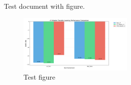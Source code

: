 \documentclass{article}
\begin{document}
Test document with figure.
\begin{figure}[h]
\centering
\includegraphics[width=0.5\textwidth]{figures/performance_comparison.pdf}
\caption{Test figure}
\end{figure}
\end{document}
